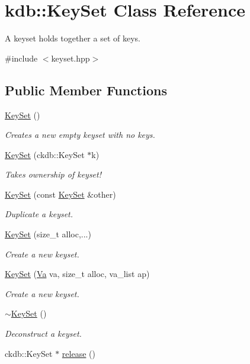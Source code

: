 \hypertarget{classkdb_1_1KeySet}{\section{kdb\+:\+:Key\+Set Class Reference}
\label{classkdb_1_1KeySet}
}


A keyset holds together a set of keys.  




{\ttfamily \#include $<$keyset.\+hpp$>$}

\subsection*{Public Member Functions}
\begin{DoxyCompactItemize}
\item 
\hyperlink{classkdb_1_1KeySet_a4eac9850fa4f06c07a5306befc3e4377}{Key\+Set} ()
\begin{DoxyCompactList}\small\item\em Creates a new empty keyset with no keys. \end{DoxyCompactList}\item 
\hyperlink{classkdb_1_1KeySet_a21f651ff310178951402038e590743e0}{Key\+Set} (ckdb\+::\+Key\+Set $\ast$k)
\begin{DoxyCompactList}\small\item\em Takes ownership of keyset! \end{DoxyCompactList}\item 
\hyperlink{classkdb_1_1KeySet_ad8d6df839ab852fded1739ff3398d0b1}{Key\+Set} (const \hyperlink{classkdb_1_1KeySet}{Key\+Set} \&other)
\begin{DoxyCompactList}\small\item\em Duplicate a keyset. \end{DoxyCompactList}\item 
\hyperlink{classkdb_1_1KeySet_ab4bb5ec4e73eca8ea1bd0a843a6489d4}{Key\+Set} (size\+\_\+t alloc,...)
\begin{DoxyCompactList}\small\item\em Create a new keyset. \end{DoxyCompactList}\item 
\hyperlink{classkdb_1_1KeySet_aacbfb3d02effb6b4c4f141dccae9f232}{Key\+Set} (\hyperlink{structkdb_1_1Va}{Va} va, size\+\_\+t alloc, va\+\_\+list ap)
\begin{DoxyCompactList}\small\item\em Create a new keyset. \end{DoxyCompactList}\item 
\hyperlink{classkdb_1_1KeySet_ade654f92bddec24abad1b651e828f2b8}{$\sim$\+Key\+Set} ()
\begin{DoxyCompactList}\small\item\em Deconstruct a keyset. \end{DoxyCompactList}\item 
\hypertarget{classkdb_1_1KeySet_a2987b3fb1b12196399650726f1c18f02}{ckdb\+::\+Key\+Set $\ast$ \hyperlink{classkdb_1_1KeySet_a2987b3fb1b12196399650726f1c18f02}{release} ()}\label{classkdb_1_1KeySet_a2987b3fb1b12196399650726f1c18f02}


\end{DoxyCompactItemize}
